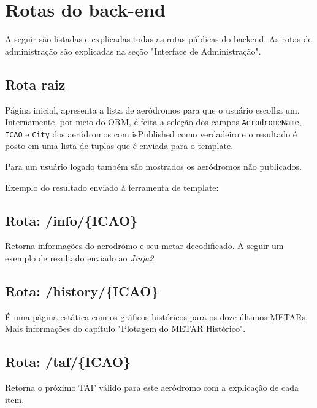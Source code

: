 \chapter{Rotas do back-end}

A seguir são listadas e explicadas todas as rotas públicas do backend. As
rotas de administração são explicadas na seção "Interface de Administração".

\section{Rota raiz}

Página inicial, apresenta a lista de aeródromos para que o usuário escolha um. 
Internamente, por meio do ORM, é feita a seleção dos campos \texttt{AerodromeName},
\texttt{ICAO} e \texttt{City} dos aeródromos com isPublished como verdadeiro e o
 resultado é posto em uma lista de tuplas que é enviada para o template.

Para um usuário logado também são mostrados os aeródromos não publicados.

Exemplo do resultado enviado à ferramenta de template:




\section{Rota: /info/\{ICAO\}}

Retorna informações do aerodrómo e seu metar decodificado. A seguir um exemplo
de resultado enviado ao \textit{Jinja2}.




\section{Rota: /history/\{ICAO\}}
É uma página estática com os gráficos históricos para os doze últimos METARs.
Mais informações do capítulo "Plotagem do METAR Histórico".


\section{Rota: /taf/\{ICAO\}}
Retorna o próximo TAF válido para este aeródromo com a explicação de cada item.

